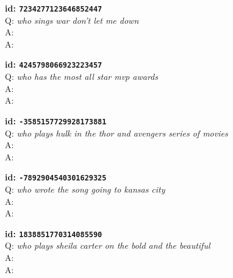 \tiny{\setlength{\parindent}{0cm}
\textbf{id: \texttt{7234277123646852447}} \\
Q: \textit{who sings war don't let me down} \\
A:  \\
A: }

\tiny{\setlength{\parindent}{0cm}
\textbf{id: \texttt{4245798066923223457}} \\
Q: \textit{who has the most all star mvp awards} \\
A:  \\
A: }

\tiny{\setlength{\parindent}{0cm}
\textbf{id: \texttt{-3585157729928173881}} \\
Q: \textit{who plays hulk in the thor and avengers series of movies} \\
A:  \\
A: }

\tiny{\setlength{\parindent}{0cm}
\textbf{id: \texttt{-7892904540301629325}} \\
Q: \textit{who wrote the song going to kansas city} \\
A:  \\
A: }

\tiny{\setlength{\parindent}{0cm}
\textbf{id: \texttt{1838851770314085590}} \\
Q: \textit{who plays sheila carter on the bold and the beautiful} \\
A:  \\
A: }
